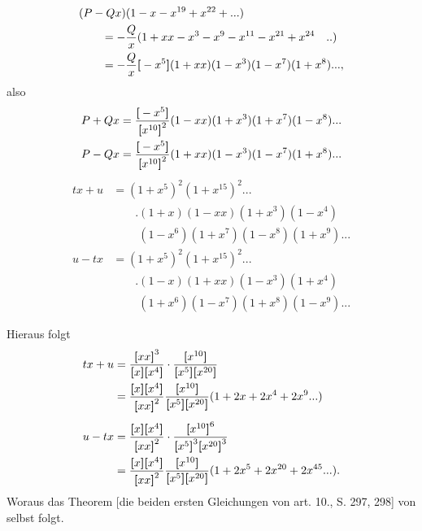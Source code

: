 \[\begin{aligned}
&(P-Qx)(1-x-x^{19}+x^{22}+{.}{.}{.})\\
&\qquad=-\frac Qx(1+xx-x^3-x^9-x^{11}-x^{21}+x^{24}\quad{.}{.})\\
&\qquad=-\frac Qx\boldsymbol{[}-x^5\boldsymbol{]}(1+xx)(1-x^3)(1-x^7)(1+x^8){.}{.}{.},
\end{aligned}\]
\noindent also
\[\begin{aligned}
P+Qx&=\frac{\boldsymbol{[}-x^5\boldsymbol{]}}{\boldsymbol{[}x^{10}\boldsymbol{]}^2}(1-xx)(1+x^3)(1+x^7)(1-x^8){.}{.}{.}\\
P-Qx&=\frac{\boldsymbol{[}-x^5\boldsymbol{]}}{\boldsymbol{[}x^{10}\boldsymbol{]}^2}(1+xx)(1-x^3)(1-x^7)(1+x^8){.}{.}{.}
\end{aligned}\]
\[\begin{aligned}
tx+u&=(1+x^5)^2(1+x^{15})^2{.}{.}{.}\\
&\qquad.(1+x)(1-xx)(1+x^3)(1-x^4)\\
&\qquad\phantom{.}(1-x^6)(1+x^7)(1-x^8)(1+x^9){.}{.}{.}
\end{aligned}\]
\clearpage
{}
\[\begin{aligned}
u-tx&=(1+x^5)^2(1+x^{15})^2{.}{.}{.}\\
&\qquad.(1-x)(1+xx)(1-x^3)(1+x^4)\\
&\qquad\phantom{.}(1+x^6)(1-x^7)(1+x^8)(1-x^9){.}{.}{.}
\end{aligned}\]
\noindent[S. 48]\par
\par\indent Hieraus folgt
\[\begin{aligned}
tx+u&=\frac{\boldsymbol{[}xx\boldsymbol{]}^3}{\boldsymbol{[}x\boldsymbol{]}\boldsymbol{[}x^4\boldsymbol{]}}\cdot\frac{\boldsymbol{[}x^{10}\boldsymbol{]}}{\boldsymbol{[}x^5\boldsymbol{]}\boldsymbol{[}x^{20}\boldsymbol{]}}\\
&=\frac{\boldsymbol{[}x\boldsymbol{]}\boldsymbol{[}x^4\boldsymbol{]}}{\boldsymbol{[}xx\boldsymbol{]}^2}\frac{\boldsymbol{[}x^{10}\boldsymbol{]}}{\boldsymbol{[}x^5\boldsymbol{]}\boldsymbol{[}x^{20}\boldsymbol{]}}(1+2x+2x^4+2x^9{.}{.}{.})\\[1ex]
u-tx&=\frac{\boldsymbol{[}x\boldsymbol{]}\boldsymbol{[}x^4\boldsymbol{]}}{\boldsymbol{[}xx\boldsymbol{]}^2}\cdot\frac{\boldsymbol{[}x^{10}\boldsymbol{]}^6}{\boldsymbol{[}x^5\boldsymbol{]}^3\boldsymbol{[}x^{20}\boldsymbol{]}^3}\\
&=\frac{\boldsymbol{[}x\boldsymbol{]}\boldsymbol{[}x^4\boldsymbol{]}}{\boldsymbol{[}xx\boldsymbol{]}^2}\frac{\boldsymbol{[}x^{10}\boldsymbol{]}}{\boldsymbol{[}x^5\boldsymbol{]}\boldsymbol{[}x^{20}\boldsymbol{]}}(1+2x^5+2x^{20}+2x^{45}{.}{.}{.}).
\end{aligned}\]
\noindent Woraus das Theorem [die beiden ersten Gleichungen von art. 10., S. 297, 298] von selbst folgt.
\clearpage
\endgroup
